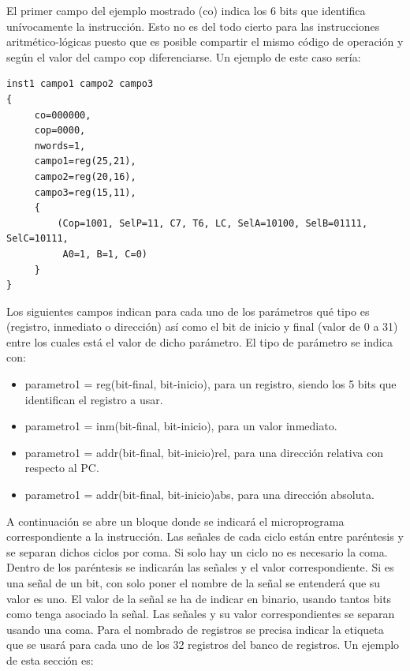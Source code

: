 El primer campo del ejemplo mostrado (co) indica los 6 bits que identifica unívocamente la instrucción. Esto no es del todo cierto para las instrucciones aritmético-lógicas puesto que es posible compartir el mismo código de operación y según el valor del campo cop diferenciarse. Un ejemplo de este caso sería:

\begin{lstlisting}
inst1 campo1 campo2 campo3
{
     co=000000,
     cop=0000,
     nwords=1,
     campo1=reg(25,21),
     campo2=reg(20,16),
     campo3=reg(15,11),
     {
         (Cop=1001, SelP=11, C7, T6, LC, SelA=10100, SelB=01111, SelC=10111,
          A0=1, B=1, C=0)
     }
}
\end{lstlisting}

Los siguientes campos indican para cada uno de los parámetros qué tipo es (registro, inmediato o dirección) así como el bit de inicio y final (valor de 0 a 31) entre los cuales está el valor de dicho parámetro. El tipo de parámetro se indica con:

\begin{itemize}

\item parametro1 = reg(bit-final, bit-inicio), para un registro, siendo los 5 bits que identifican el registro a usar.

\item parametro1 = inm(bit-final, bit-inicio), para un valor inmediato.

\item parametro1 = addr(bit-final, bit-inicio)rel, para una dirección relativa con respecto al PC.

\item parametro1 = addr(bit-final, bit-inicio)abs, para una dirección absoluta.

\end{itemize}

A continuación se abre un bloque donde se indicará el microprograma correspondiente a la instrucción. Las señales de cada ciclo están entre paréntesis y se separan dichos ciclos por coma. Si solo hay un ciclo no es necesario la coma. Dentro de los paréntesis se indicarán las señales y el valor correspondiente. Si es una señal de un bit, con solo poner el nombre de la señal se entenderá que su valor es uno. El valor de la señal se ha de indicar en binario, usando tantos bits como tenga asociado la señal. Las señales y su valor correspondientes se separan usando una coma. Para el nombrado de registros se precisa indicar la etiqueta que se usará para cada uno de los 32 registros del banco de registros. Un ejemplo de esta sección es:

